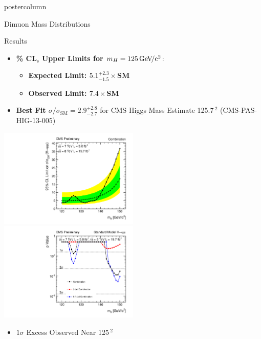\documentclass[final,hyperref={pdfpagelabels=false}]{beamer}
\newcommand{\GeVcc}{\,\text{Ge\kern -0.1em  V\!/c}\ensuremath{\mathrm{^2}}}
\newcommand{\cls}{CL$\mathrm{_s}$}
\begin{document}
\begin{frame}
\begin{columns}
\begin{column}{.49\textwidth}
\begin{beamercolorbox}[center,wd=\textwidth]{postercolumn}
\begin{minipage}[T]{.95\textwidth}
{\begin{block}{Dimuon Mass Distributions}
\begin{center}
              \end{center}
            \end{block}
            \vfill
            \begin{block}{Results}
              \begin{itemize}
                \item \textbf{\% \cls{} Upper Limits for $m_H = 125 \GeVcc{}$}:
                \begin{itemize}
                  \item \textbf{\boldmath Expected Limit: $5.1^{+2.3}_{-1.5}\times$SM}
                  \item \textbf{\boldmath Observed Limit: $7.4\times$SM}
                \end{itemize}              
                \item \textbf{\boldmath Best Fit $\sigma/\sigma_{\mathrm{SM}}=2.9^{+2.8}_{-2.7}$} for CMS Higgs Mass Estimate 125.7\GeVcc{} (CMS-PAS-HIG-13-005)
              \end{itemize}              
              \begin{center}
                \includegraphics[width=0.5\textwidth]{plotsPublic/limits_annalysisA/pdf/CombSplitAll_7P8TeV.pdf}
                \includegraphics[width=0.5\textwidth]{plotsPublic/pValues_analysisA/pdf/pValues_Final7P8TeV.pdf}
              \end{center}
              \begin{itemize}
                \item $1\sigma$ Excess Observed Near 125\GeVcc{}

\end{itemize}
\end{block}}
\end{minipage}
\end{beamercolorbox}
\end{column}
\end{columns}
\end{frame}
\end{document}
